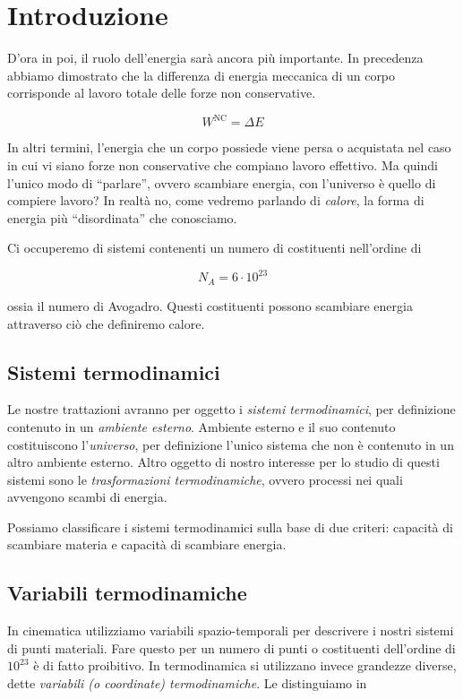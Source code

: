 
\section{Introduzione}
D'ora in poi, il ruolo dell'energia sarà ancora più importante. In precedenza
abbiamo dimostrato che la differenza di energia meccanica di un corpo corrisponde
al lavoro totale delle forze non conservative.

\[ W^\text{NC} = \Delta E \]

\noindent In altri termini, l'energia che un corpo possiede viene persa o acquistata
nel caso in cui vi siano forze non conservative che compiano lavoro effettivo. Ma
quindi l'unico modo di ``parlare'', ovvero scambiare energia, con l'universo è quello
di compiere lavoro? In realtà no, come vedremo parlando di \textit{calore}, la forma
di energia più ``disordinata'' che conosciamo.

Ci occuperemo di sistemi contenenti un numero di costituenti nell'ordine di

\[ N_A = 6 \cdot 10^{23} \]

\noindent ossia il numero di Avogadro. Questi costituenti possono scambiare energia
attraverso ciò che definiremo calore.

\subsection*{Sistemi termodinamici}
Le nostre trattazioni avranno per oggetto i \textit{sistemi termodinamici}, per
definizione contenuto in un \textit{ambiente esterno}. Ambiente esterno e il suo
contenuto costituiscono l'\textit{universo}, per definizione l'unico sistema che
non è contenuto in un altro ambiente esterno.
Altro oggetto di nostro interesse per lo studio di questi sistemi sono le
\textit{trasformazioni termodinamiche}, ovvero processi nei quali avvengono
scambi di energia.

Possiamo classificare i sistemi termodinamici sulla base di due criteri: capacità
di scambiare materia e capacità di scambiare energia.

\subsection*{Variabili termodinamiche}
In cinematica utilizziamo variabili spazio-temporali per descrivere i nostri
sistemi di punti materiali. Fare questo per un numero di punti o costituenti
dell'ordine di $10^{23}$ è di fatto proibitivo. In termodinamica si utilizzano
invece grandezze diverse, dette \textit{variabili (o coordinate) termodinamiche}.
Le distinguiamo in

